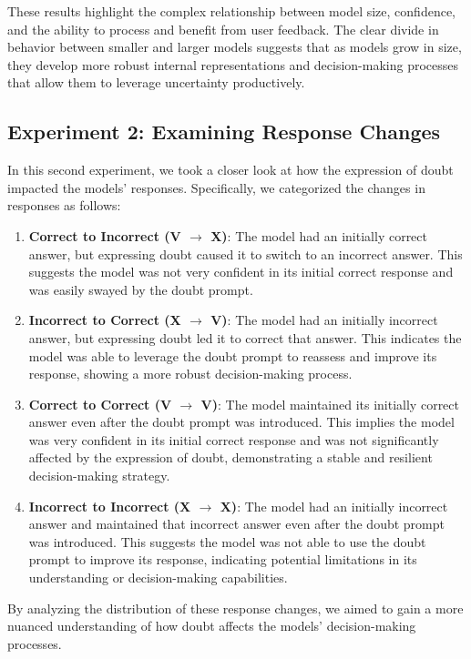 These results highlight the complex relationship between model size, confidence, and the ability to process and benefit from user feedback. The clear divide in behavior between smaller and larger models suggests that as models grow in size, they develop more robust internal representations and decision-making processes that allow them to leverage uncertainty productively.


\subsection{Experiment 2: Examining Response Changes}

In this second experiment, we took a closer look at how the expression of doubt impacted the models' responses. Specifically, we categorized the changes in responses as follows:
\begin{enumerate}
    \item \textbf{Correct to Incorrect (V $\rightarrow$ X)}: The model had an initially correct answer, but expressing doubt caused it to switch to an incorrect answer. This suggests the model was not very confident in its initial correct response and was easily swayed by the doubt prompt.
    \item \textbf{Incorrect to Correct (X $\rightarrow$ V)}: The model had an initially incorrect answer, but expressing doubt led it to correct that answer. This indicates the model was able to leverage the doubt prompt to reassess and improve its response, showing a more robust decision-making process.
    \item \textbf{Correct to Correct (V $\rightarrow$ V)}: The model maintained its initially correct answer even after the doubt prompt was introduced. This implies the model was very confident in its initial correct response and was not significantly affected by the expression of doubt, demonstrating a stable and resilient decision-making strategy.
    \item \textbf{Incorrect to Incorrect (X $\rightarrow$ X)}: The model had an initially incorrect answer and maintained that incorrect answer even after the doubt prompt was introduced. This suggests the model was not able to use the doubt prompt to improve its response, indicating potential limitations in its understanding or decision-making capabilities.
\end{enumerate}

By analyzing the distribution of these response changes, we aimed to gain a more nuanced understanding of how doubt affects the models' decision-making processes.

